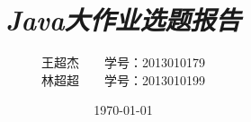 \documentclass[12pt]{article}
\begin{document}
\title{ \textbf{\emph{Java大作业选题报告}}}
\date{\today}
\author{王超杰 ~ ~ 学号：2013010179 \\ 林超超 ~ ~ 学号：2013010199}

\maketitle


\tableofcontents
\thispagestyle{empty}
\newpage
\setcounter{page}{1}






% 

\end{document}
